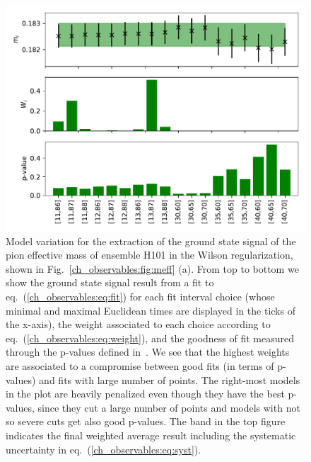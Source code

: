 \begin{figure}
\centering
	\includegraphics[width=.8\textwidth]{./cap3/figs/m_H101_pion_wil.pdf}
    \caption{Model variation for the extraction of the ground state signal of the pion effective mass of ensemble H101 in the Wilson regularization, shown in Fig.~\ref{ch_observables:fig:meff} (a). From top to bottom we show the ground state signal result from a fit to eq.~(\ref{ch_observables:eq:fit}) for each fit interval choice (whose minimal and maximal Euclidean times are displayed in the ticks of the x-axis), the weight associated to each choice according to eq.~(\ref{ch_observables:eq:weight}), and the goodness of fit measured through the p-values defined in~\citep{Bruno:2022mfy}. We see that the highest weights are associated to a compromise between good fits (in terms of p-values) and fits with large number of points. The right-most models in the plot are heavily penalized even though they have the best p-values, since they cut a large number of points and models with not so severe cuts get also good p-values. The band in the top figure indicates the final weighted average result including the systematic uncertainty in eq.~(\ref{ch_observables:eq:syst}).}
    \label{ch_observables:fig:model_av}
\end{figure}



